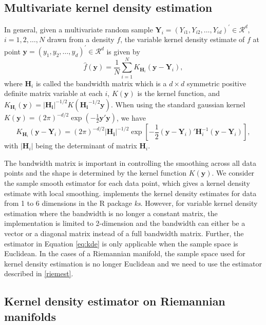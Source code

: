 \documentclass[11pt,a4paper,]{article}
\begin{document}
\hypertarget{multivariate-kernel-density-estimation}{%
\subsection{Multivariate kernel density estimation}\label{multivariate-kernel-density-estimation}}

In general, given a multivariate random sample
\(\pmb{Y}_i=(Y_{i1}, Y_{i2}, \dots, Y_{id})^\prime \in \mathcal{R}^d\),
\(i = 1, 2, \dots, N\) drawn from a density \(f\), the variable kernel
density estimate of \(f\) at point
\(\pmb{y}=(y_1, y_2, \dots, y_d)^\prime \in \mathcal{R}^d\) is given by
\begin{equation}
\label{eq:kde}
\hat{f}(\pmb{y})=\frac{1}{N}\sum\limits_{i=1}^N K_{\pmb{H}_i}(\pmb{y}-\pmb{Y}_i),
\end{equation} where \(\pmb{H}_i\) is called the bandwidth matrix which is
a \(d\times d\) symmetric positive definite matrix variable at each \(i\),
\(K(\pmb{y})\) is the kernel function, and
\(K_{\pmb{H}_i}(\pmb{y}) = |\pmb{H_i}|^{-1/2} K(\pmb{H_i}^{-1/2}\pmb{y})\).
When using the standard gaussian kernel
\(K(\pmb{y}) = (2\pi)^{-d/2}\exp(-\frac{1}{2}\pmb{y}'\pmb{y})\), we have
\begin{equation}
\label{eq:kernel}
K_{\pmb{H}_i}(\pmb{y}-\pmb{Y}_i)=(2\pi)^{-d/2}|\pmb{H_i}|^{-1/2}\exp\left[-\frac{1}{2}(\pmb{y}-\pmb{Y}_i)'\pmb{H}_i^{-1}(\pmb{y}-\pmb{Y}_i)\right],
\end{equation} with \(|\pmb{H}_i|\) being the determinant of matrix
\(\pmb{H}_i\).

The bandwidth matrix is important in controlling the smoothing across
all data points and the shape is determined by the kernel function
\(K(\pmb{y})\). We consider the sample smooth estimator for each data
point, which gives a kernel density estimate with local smoothing.
\textcite{Duong2007-up} implements the kernel density estimates for data from 1 to
6 dimensions in the R package \emph{ks}. However, for variable kernel density
estimation where the bandwidth is no longer a constant matrix, the
implementation is limited to 2-dimension and the bandwidth can either be
a vector or a diagonal matrix instead of a full bandwidth matrix.
Further, the estimator in Equation \eqref{eq:kde} is only applicable when
the sample space is Euclidean. In the cases of a Riemannian manifold,
the sample space used for kernel density estimation is no longer
Euclidean and we need to use the estimator described in
\autoref{riemest}.

\hypertarget{riemest}{%
\subsection{Kernel density estimator on Riemannian manifolds}\label{riemest}}
\end{document}

